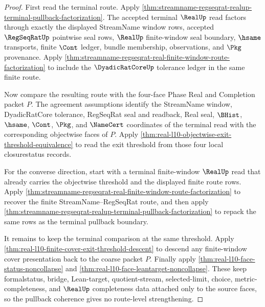 \begin{proof}
First read the terminal route. Apply
\autoref{thm:streamname-regseqrat-realup-terminal-pullback-factorization}. The
accepted terminal $\RealUp$ read factors through exactly the displayed
StreamName window rows, accepted $\RegSeqRatUp$ pointwise seal rows,
$\RealUp$ finite-window seal boundary, $\hsame$ transports, finite $\Cont$
ledger, bundle membership, observations, and $\Pkg$ provenance. Apply
\autoref{thm:streamname-regseqrat-real-finite-window-route-factorization} to
include the $\DyadicRatCoreUp$ tolerance ledger in the same finite route.

Now compare the resulting route with the four-face Phase Real and Completion
packet $P$. The agreement assumptions identify the StreamName window,
DyadicRatCore tolerance, RegSeqRat seal and readback, Real seal, $\BHist$,
$\hsame$, $\Cont$, $\Pkg$, and $\NameCert$ coordinates of the terminal read
with the corresponding objectwise faces of $P$. Apply
\autoref{thm:real-l10-objectwise-exit-threshold-equivalence} to read the exit
threshold from those four local closurestatus records.

For the converse direction, start with a terminal finite-window $\RealUp$ read
that already carries the objectwise threshold and the displayed finite route
rows. Apply
\autoref{thm:streamname-regseqrat-real-finite-window-route-factorization} to
recover the finite StreamName--RegSeqRat route, and then apply
\autoref{thm:streamname-regseqrat-realup-terminal-pullback-factorization} to
repack the same rows as the terminal pullback boundary.

It remains to keep the terminal comparison at the same threshold. Apply
\autoref{thm:real-l10-finite-cover-exit-threshold-descent} to descend any
finite-window cover presentation back to the coarse packet $P$. Finally apply
\autoref{thm:real-l10-face-status-noncollapse} and
\autoref{thm:real-l10-face-leantarget-noncollapse}. These keep formalstatus,
bridge, Lean-target, quotient-stream, selected-limit, choice,
metric-completeness, and $\RealUp$ completeness data attached only to the
source faces, so the pullback coherence gives no route-level strengthening.
\end{proof}

